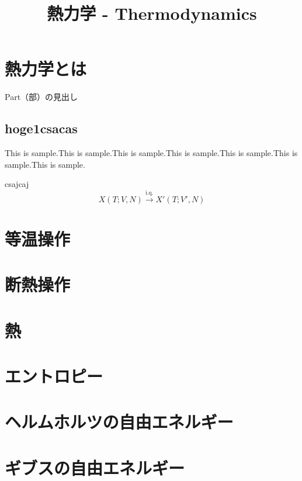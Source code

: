\documentclass[a4paper]{jsreport}
\title{熱力学 - Thermodynamics}
\begin{document}
    \maketitle

    \tableofcontents

    \chapter{熱力学とは}
        Part（部）の見出し
        \section{hoge1csacas}
            This is sample.This is sample.This is sample.This is sample.This is sample.This is sample.This is sample. \par
            csajcaj
            \begin{equation}
                X(T; V, N) \xrightarrow{\text{i.q.}} X'(T; V', N)
            \end{equation}
    

    \chapter{等温操作}


    \chapter{断熱操作}
    
    
    \chapter{熱}
    
    
    \chapter{エントロピー}
    
    
    \chapter{ヘルムホルツの自由エネルギー}
    
    
    \chapter{ギブスの自由エネルギー}
        
\end{document}
